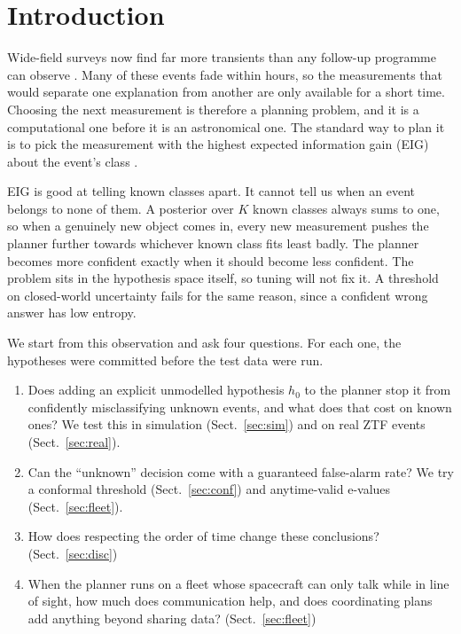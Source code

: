 \documentclass[final,5p,times,twocolumn,authoryear]{elsarticle}
\begin{document}
\section{Introduction}\label{sec:intro}

Wide-field surveys now find far more transients than any follow-up programme can observe \citep{Bellm2019,Ivezic2019}. Many of these events fade within hours, so the measurements that would separate one explanation from another are only available for a short time. Choosing the next measurement is therefore a planning problem, and it is a computational one before it is an astronomical one. The standard way to plan it is to pick the measurement with the highest expected information gain (EIG) about the event's class \citep{Lindley1956,Chaloner1995}.

EIG is good at telling known classes apart. It cannot tell us when an event belongs to none of them. A posterior over $K$ known classes always sums to one, so when a genuinely new object comes in, every new measurement pushes the planner further towards whichever known class fits least badly. The planner becomes more confident exactly when it should become less confident. The problem sits in the hypothesis space itself, so tuning will not fix it. A threshold on closed-world uncertainty fails for the same reason, since a confident wrong answer has low entropy.

We start from this observation and ask four questions. For each one, the hypotheses were committed before the test data were run.
\begin{enumerate}
\item Does adding an explicit unmodelled hypothesis $h_0$ to the planner stop it from confidently misclassifying unknown events, and what does that cost on known ones? We test this in simulation (Sect.~\ref{sec:sim}) and on real ZTF events (Sect.~\ref{sec:real}).
\item Can the ``unknown'' decision come with a guaranteed false-alarm rate? We try a conformal threshold (Sect.~\ref{sec:conf}) and anytime-valid e-values (Sect.~\ref{sec:fleet}).
\item How does respecting the order of time change these conclusions? (Sect.~\ref{sec:disc})
\item When the planner runs on a fleet whose spacecraft can only talk while in line of sight, how much does communication help, and does coordinating plans add anything beyond sharing data? (Sect.~\ref{sec:fleet})
\end{enumerate}
\end{document}
